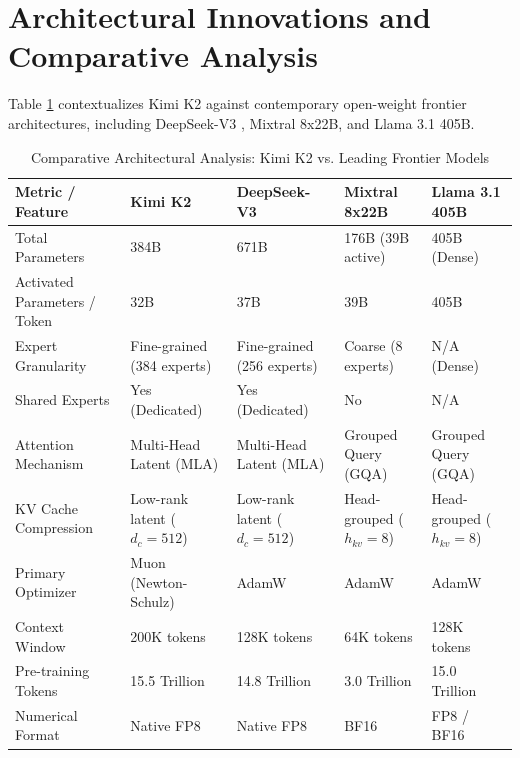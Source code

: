 \documentclass[conference]{IEEEtran}
\begin{document}
\section{Architectural Innovations and Comparative Analysis}
Table \ref{tab:comparison} contextualizes Kimi K2 against contemporary open-weight frontier architectures, including DeepSeek-V3 \cite{deepseek2024v3}, Mixtral 8x22B, and Llama 3.1 405B.

\begin{table}[t]
\caption{Comparative Architectural Analysis: Kimi K2 vs. Leading Frontier Models}
\label{tab:comparison}
\centering
\small
\begin{tabularx}{\textwidth}{lXXXX}
\toprule
\textbf{Metric / Feature} & \textbf{Kimi K2} & \textbf{DeepSeek-V3} & \textbf{Mixtral 8x22B} & \textbf{Llama 3.1 405B} \\
\midrule
Total Parameters & 384B & 671B & 176B (39B active) & 405B (Dense) \\
Activated Parameters / Token & 32B & 37B & 39B & 405B \\
Expert Granularity & Fine-grained (384 experts) & Fine-grained (256 experts) & Coarse (8 experts) & N/A (Dense) \\
Shared Experts & Yes (Dedicated) & Yes (Dedicated) & No & N/A \\
Attention Mechanism & Multi-Head Latent (MLA) & Multi-Head Latent (MLA) & Grouped Query (GQA) & Grouped Query (GQA) \\
KV Cache Compression & Low-rank latent ($d_c = 512$) & Low-rank latent ($d_c = 512$) & Head-grouped ($h_{kv}=8$) & Head-grouped ($h_{kv}=8$) \\
Primary Optimizer & Muon (Newton-Schulz) & AdamW & AdamW & AdamW \\
Context Window & 200K tokens & 128K tokens & 64K tokens & 128K tokens \\
Pre-training Tokens & 15.5 Trillion & 14.8 Trillion & 3.0 Trillion & 15.0 Trillion \\
Numerical Format & Native FP8 & Native FP8 & BF16 & FP8 / BF16 \\
\bottomrule
\end{tabularx}
\end{table}
\end{document}
